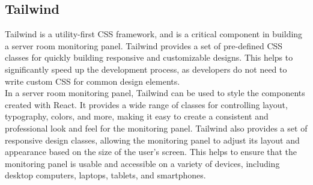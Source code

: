     \subsection{Tailwind}
    Tailwind is a utility-first CSS framework, and is a critical component in building a server room monitoring panel. Tailwind provides a set of pre-defined CSS classes for quickly building responsive and customizable designs. This helps to significantly speed up the development process, as developers do not need to write custom CSS for common design elements.\\
    In a server room monitoring panel, Tailwind can be used to style the components created with React. It provides a wide range of classes for controlling layout, typography, colors, and more, making it easy to create a consistent and professional look and feel for the monitoring panel. Tailwind also provides a set of responsive design classes, allowing the monitoring panel to adjust its layout and appearance based on the size of the user's screen. This helps to ensure that the monitoring panel is usable and accessible on a variety of devices, including desktop computers, laptops, tablets, and smartphones.

